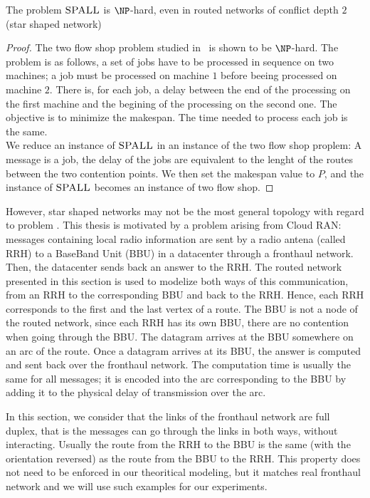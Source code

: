  \begin{theorem}\label{th:spallHard}
The problem $\textsc{SPALL}$ is $\NP$-hard, even in routed networks of conflict depth $2$ (star shaped network)
\end{theorem}
\begin{proof}
The two flow shop problem studied in~\cite{yu2004minimizing} is shown to be $\NP$-hard. The problem is as follows, a set of jobs have to be processed in sequence on two machines; a job must be processed on machine $1$ before beeing processed on machine $2$. There is, for each job, a delay between the end of the processing on the first machine and the begining of the processing on the second one. The objective is to minimize the makespan. The time needed to process each job is the same.\\
We reduce an instance of $\textsc{SPALL}$ in an instance of the two flow shop proplem: A message is a job, the delay of the jobs are equivalent to the lenght of the routes between the two contention points. We then set the makespan value to $P$, and the instance of $\textsc{SPALL}$ becomes an instance of two flow shop.
\end{proof}




However, star shaped networks may not be the most general topology with regard to problem \spall.
  This thesis is motivated by a problem arising from Cloud RAN: messages containing local radio information are sent by a radio antena (called RRH) to a BaseBand Unit (BBU) in a datacenter through a fronthaul network. Then, the datacenter sends back an answer to the RRH. The routed network presented in this section is used to modelize both ways of this communication, from an RRH to the corresponding BBU and back to the RRH. Hence, each RRH corresponds to the first and the last vertex of a route. The BBU is not a node of the routed network, since each RRH has its own BBU, there are no contention when going through the BBU. The datagram arrives at the BBU somewhere on an arc of the route. Once a datagram arrives at its BBU, the answer is computed and sent back over the fronthaul network. The computation time is usually the same for all messages; it is encoded into the arc corresponding to the BBU by adding it to the physical delay of transmission over the arc.
  
  In this section, we consider that the links of the fronthaul network are full duplex, that is the messages can go through the links in both ways, without interacting. Usually the route from the RRH to the BBU is the same (with the orientation reversed) as the route from the BBU to the RRH. This property does not need to be enforced in our theoritical modeling, but it matches real fronthaul network and we will use such examples for our experiments. 

